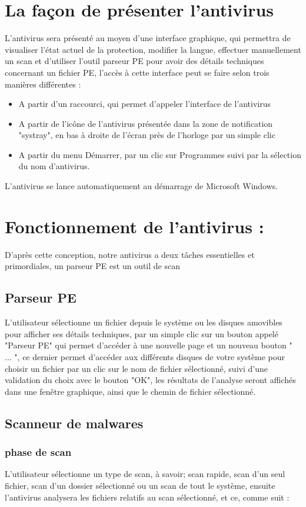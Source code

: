 \section{La façon de présenter l'antivirus}
L'antivirus sera présenté au moyen d'une interface graphique, qui permettra de visualiser l'état actuel de la protection, modifier la langue, effectuer manuellement un scan et d'utiliser l'outil parseur PE pour avoir des détails techniques concernant un fichier PE, l'accès à cette interface peut se faire selon trois manières différentes :
\begin{itemize}
\item A partir d'un raccourci, qui permet d'appeler l'interface de l'antivirus
\item A partir de l'icône de l'antivirus présentée dans la zone de notification "systray", en bas à droite de l'écran près de l'horloge par un simple clic
\item A partir du menu Démarrer, par un clic sur Programmes suivi par la sélection du nom d'antivirus. \\
\end{itemize}
L'antivirus se lance automatiquement au démarrage de Microsoft Windows.
\section{Fonctionnement de  l'antivirus :}
D'après cette conception, notre antivirus a deux tâches essentielles et primordiales, un parseur PE est un outil de scan
\subsection{Parseur PE }
L'utilisateur sélectionne un fichier depuis le système ou les disques amovibles pour afficher ses détails techniques, par un simple clic sur un bouton appelé "Parseur PE" qui permet d'accéder à une nouvelle page et un nouveau bouton " ... ", ce dernier permet d'accéder aux différents disques de votre système pour choisir un fichier par un clic sur le nom de fichier sélectionné, suivi d'une validation du choix avec le bouton "OK", les résultats de l'analyse seront affichés dans une fenêtre graphique, ainsi que le chemin de fichier sélectionné.
\subsection{Scanneur de malwares}
\subsubsection{phase de scan}
L'utilisateur sélectionne un type de scan, à savoir; scan rapide, scan d'un seul fichier, scan d'un dossier sélectionné ou un scan de tout le système, ensuite l'antivirus analysera  les fichiers relatifs au scan sélectionné, et ce, comme suit :\\

